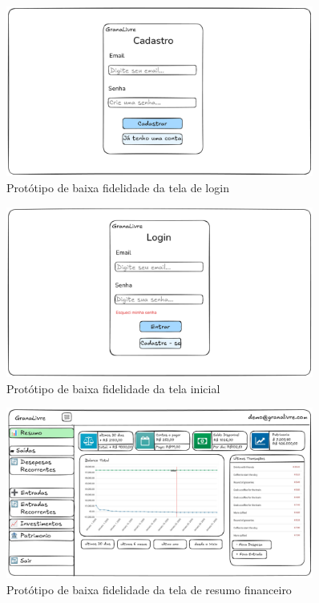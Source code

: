 \begin{figure}[H]
    \centering
    \includegraphics[width=0.9\textwidth]{imgs/01-cadastro.png}
    \caption{Protótipo de baixa fidelidade da tela de login}
    \label{fig:prot_login}
\end{figure}

\begin{figure}[H]
    \centering
    \includegraphics[width=0.9\textwidth]{imgs/02-login.png}
    \caption{Protótipo de baixa fidelidade da tela inicial}
    \label{fig:prot_inicial}
\end{figure}

\begin{figure}[H]
    \centering
    \includegraphics[width=0.9\textwidth]{imgs/03-resumo.png}
    \caption{Protótipo de baixa fidelidade da tela de resumo financeiro}
    \label{fig:prot_resumo}
\end{figure}


